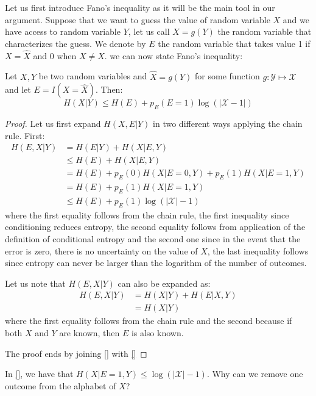 Let us first introduce Fano's inequality as it will be the main tool in our argument. Suppose that we want to guess the value of random variable $X$ and we have access to random variable $Y$, let us call $\hat X=g(Y)$ the random variable that characterizes the guess. We denote by $E$ the random variable that takes value 1 if $X=\hat X$ and 0 when $X\neq\hat X$. we can now state Fano's inequality:
\begin{theorem}
Let $X,Y$ be two random variables and $\hat X=g(Y)$ for some function $g:\mathcal Y\mapsto\mathcal X$ and let $E=I(X=\hat X)$. Then:
\begin{equation}
H(X|Y)\leq H(E) + p_E(E=1)\log(|\mathcal X -1|)
\end{equation}
\end{theorem}
\begin{proof}
Let us first expand $H(X,E|Y)$ in two different ways applying the chain rule. First:
\begin{align}
H(E,X|Y) &= H(E|Y)+H(X|E,Y)\\
         &\leq H(E) + H(X|E,Y)\\
         &= H(E) + p_E(0) H(X|E=0, Y) + p_E(1)H(X|E=1,Y)\\
         &= H(E) + p_E(1)H(X|E=1,Y)\\
         &\leq H(E) + p_E(1)\log(|\mathcal X|-1)
\end{align}
where the first equality follows from the chain rule, the first inequality since conditioning reduces entropy, the second equality follows from application of the definition of conditional entropy and the second one since in the event that the error is zero, there is no uncertainty on the value of $X$, the last inequality follows since entropy can never be larger than the logarithm of the number of outcomes.

Let us note that $H(E,X|Y)$ can also be expanded as:
\begin{align}
H(E,X|Y)&=H(X|Y)+H(E|X,Y)\\
        &=H(X|Y)
\end{align}
where the first equality follows from the chain rule and the second because if both $X$ and $Y$ are known, then $E$ is also known.

The proof ends by joining \eqref{} with \eqref{}
\end{proof}
\begin{exercise}
In \eqref{}, we have that $H(X|E=1,Y)\leq \log(|\mathcal X|-1)$. Why can we remove one outcome from the alphabet of $X$?
\end{exercise}

